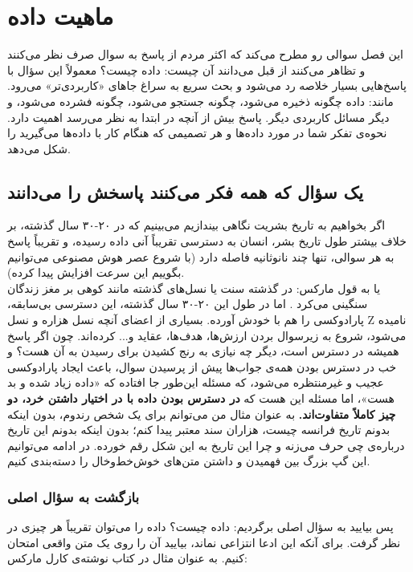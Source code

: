 \chapter{ماهیت داده}
\label{ch:nature-of-data}

این فصل سوالی رو مطرح می‌کند که اکثر مردم از پاسخ به سوال صرف نظر می‌کنند و تظاهر می‌کنند از قبل می‌دانند آن چیست: داده چیست؟
معمولاً این سؤال با پاسخ‌هایی بسیار خلاصه رد می‌شود و بحث سریع به سراغ جاهای «کاربردی‌تر» می‌رود. مانند:
داده چگونه ذخیره می‌شود، چگونه جستجو می‌شود، چگونه فشرده می‌شود، و دیگر مسائل کاربردی دیگر\autocite{knuth1997}. پاسخ بیش از آنچه در ابتدا به نظر می‌رسد اهمیت دارد. نحوه‌ی تفکر شما در مورد داده‌ها و هر تصمیمی که هنگام کار با داده‌ها می‌گیرید را شکل می‌دهد.
\newpage
\section{یک سؤال که همه فکر می‌کنند پاسخش را می‌دانند}
\label{sec:question-everyone-thinks-they-know}

اگر بخواهیم به تاریخ بشریت نگاهی بیندازیم می‌بینیم که در ۲۰-۳۰ سال گذشته، بر خلاف بیشتر طول تاریخ بشر، انسان به دسترسی تقریباً آنی داده رسیده، و تقریباً پاسخ به هر سوالی، تنها چند نانوثانیه فاصله دارد (با شروع عصر هوش مصنوعی می‌توانیم بگوییم این سرعت افزایش پیدا کرده).\\
یا به قول مارکس:
در گذشته سنت یا نسل‌های گذشته مانند کوهی بر مغز زندگان سنگینی می‌کرد \autocite{marx1852}. اما در طول این ۲۰-۳۰ سال گذشته، این دسترسی بی‌سابقه، پارادوکسی را هم با خودش آورده. بسیاری از اعضای آنچه نسل هزاره و نسل Z نامیده می‌شود، شروع به زیرسوال بردن ارزش‌ها، هدف‌ها، عقاید و... کرده‌اند. چون اگر پاسخ همیشه در دسترس است، دیگر چه نیازی به رنج کشیدن برای رسیدن به آن هست؟
و خب در دسترس بودن همه‌ی جواب‌ها پیش از پرسیدن سوال، باعث ایجاد پارادوکسی عجیب و غیرمنتظره می‌شود، که مسئله این‌طور جا افتاده که «داده زیاد شده و بد هست»، اما مسئله این هست که \textbf{در دسترس بودن داده با در اختیار داشتن خرد، دو چیز کاملاً متفاوت‌اند.} به عنوان مثال من می‌توانم برای یک شخص رندوم، بدون اینکه بدونم تاریخ فرانسه چیست، هزاران سند معتبر پیدا کنم؛ بدون اینکه بدونم این تاریخ درباره‌ی چی حرف می‌زنه و چرا این تاریخ به این شکل رقم خورده. در ادامه می‌توانیم این گپ بزرگ بین فهمیدن و داشتن متن‌های خوش‌خط‌وخال را دسته‌بندی کنیم.
\newpage
\subsection{بازگشت به سؤال اصلی}
\label{sub:return-to-main-question}

پس بیایید به سؤال اصلی برگردیم: داده چیست؟ داده را می‌توان تقریباً هر چیزی در نظر گرفت. برای آنکه این ادعا انتزاعی نماند، بیایید آن را روی یک متن واقعی امتحان کنیم. به عنوان مثال در کتاب \textit{} نوشته‌ی کارل مارکس\autocite{marx1852}:


